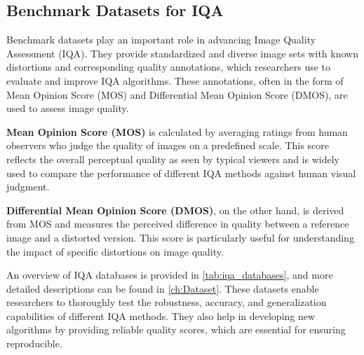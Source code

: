 \subsection{Benchmark Datasets for IQA}
\label{sub:BenchmarkDatasetsIQA}
Benchmark datasets play an important role in advancing Image Quality Assessment (IQA). They provide standardized and diverse image sets with known distortions and corresponding quality annotations, which researchers use to evaluate and improve IQA algorithms. These annotations, often in the form of Mean Opinion Score (MOS) and Differential Mean Opinion Score (DMOS),  are used to assess image quality. \par
\vspace{\baselineskip}
\noindent
\textbf{Mean Opinion Score (MOS)} is calculated by averaging ratings from human observers who judge the quality of images on a predefined scale. This score reflects the overall perceptual quality as seen by typical viewers and is widely used to compare the performance of different IQA methods against human visual judgment. \par
\vspace{\baselineskip}
\noindent
\textbf{Differential Mean Opinion Score (DMOS)}, on the other hand, is derived from MOS and measures the perceived difference in quality between a reference image and a distorted version. This score is particularly useful for understanding the impact of specific distortions on image quality. \par
\vspace{\baselineskip}
\noindent
An overview of IQA databases is provided in \autoref{tab:iqa_databases}, and more detailed descriptions can be found in \autoref{ch:Dataset}. These datasets enable researchers to thoroughly test the robustness, accuracy, and generalization capabilities of different IQA methods. They also help in developing new algorithms by providing reliable quality scores, which are essential for ensuring reproducible. \par

